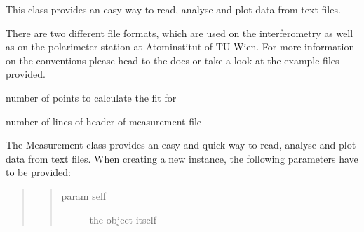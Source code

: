 \documentclass[letterpaper,10pt,english]{sphinxmanual}
\begin{document}
\begin{fulllineitems}
\label{\detokenize{measurement:measurement.Measurement}}
This class provides an easy way to read, analyse and plot data from
text files.

There are two different file formats, which are used on the interferometry
as well as on the polarimeter station at Atominstitut of TU Wien. For more
information on the conventions please head to the docs or take a look at
the example files provided.

\begin{fulllineitems}
\label{\detokenize{measurement:measurement.Measurement.FIT_RESOLUTION}}
number of points to calculate the fit for

\end{fulllineitems}


\begin{fulllineitems}
\label{\detokenize{measurement:measurement.Measurement.N_HEADER}}
number of lines of header of measurement file

\end{fulllineitems}


\begin{fulllineitems}
\label{\detokenize{measurement:measurement.Measurement.__init__}}
The Measurement class provides an easy and quick way to read, 
analyse and plot data from text files. When creating a new instance,
the following parameters have to be provided:
\begin{quote}
\begin{quote}\begin{description}
\item[{param self}] \leavevmode
the object itself


\end{description}
\end{quote}
\end{quote}
\end{fulllineitems}
\end{fulllineitems}
\end{document}
